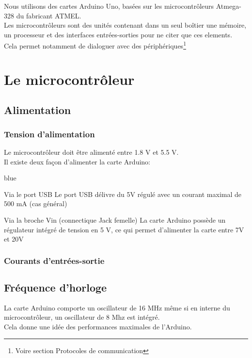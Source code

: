 Nous utilisons des cartes Arduino Uno, basées sur les microcontrôleurs Atmega-328 du fabricant ATMEL.\\
Les microcontrôleurs sont des unités contenant dans un seul boîtier une mémoire, un processeur et des 
interfaces entrées-sorties pour ne citer que ces elements.
 \\
 Cela permet notamment de dialoguer avec des périphériques\footnote{Voire section Protocoles de communication}

\section{Le microcontrôleur}


\subsection{Alimentation}

\subsubsection{Tension d'alimentation}

Le microcontrôleur doit être alimenté entre 1.8 V et 5.5 V. \\
Il existe deux façon d'alimenter la carte Arduino: 

\begin{items}{blue}{\Triangle}
\item Via le port USB 
Le port USB délivre du 5V régulé avec un courant maximal de 500 mA (cas général)
\item Via la broche Vin (connectique Jack femelle)
La carte Arduino possède un régulateur intégré de tension en 5 V, ce qui permet d'alimenter la carte entre 7V et 20V

\end{items}

\subsubsection{Courants d'entrées-sortie}

\subsection{Fréquence d'horloge}

La carte Arduino comporte un oscillateur de 16 MHz même si en interne du microcontrôleur, 
un oscillateur de 8 Mhz est intégré.\\
Cela donne une idée des performances maximales de l'Arduino.



